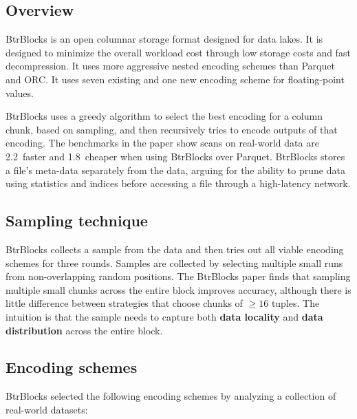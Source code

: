 \documentclass[11pt]{article}
\begin{document}
\subsection{Overview}
BtrBlocks is an open columnar storage format designed for data lakes. It is designed to minimize the overall workload cost through low storage costs and fast decompression. It uses more aggressive nested encoding schemes than Parquet and ORC\@. It uses seven existing and one new encoding scheme for floating-point values.

BtrBlocks uses a greedy algorithm to select the best encoding for a column chunk, based on sampling, and then recursively tries to encode outputs of that encoding. The benchmarks in the paper show scans on real-world data are 2.2\texttimes\ faster and 1.8\texttimes\ cheaper when using BtrBlocks over Parquet. BtrBlocks stores a file's meta-data separately from the data, arguing for the ability to prune data using statistics and indices before accessing a file through a high-latency network.

\subsection{Sampling technique}

BtrBlocks collects a sample from the data and then tries out all viable encoding schemes for three rounds. Samples are collected by selecting multiple small runs from non-overlapping random positions. The BtrBlocks paper finds that sampling multiple small chunks across the entire block improves accuracy, although there is little difference between strategies that choose chunks of $\geq 16$ tuples. The intuition is that the sample needs to capture both \textbf{data locality} and \textbf{data distribution} across the entire block.

\subsection{Encoding schemes}

BtrBlocks selected the following encoding schemes by analyzing a collection of real-world datasets:
\end{document}
